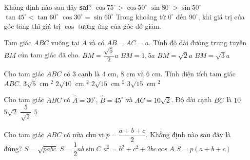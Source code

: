 \begin{ex}
	Khẳng định nào sau đây \textbf{sai}?
	\choice
	{\True $\cos 75^\circ >\cos 50^\circ $}
	{$\sin 80^\circ >\sin 50^\circ $}
	{$\tan 45^\circ <\tan 60^\circ $}
	{$\cos 30^\circ =\sin 60^\circ $}
	\loigiai
	{Trong khoảng từ $0^\circ$ đến $90^\circ$, khi giá trị của góc tăng thì giá trị $\cos$ tương ứng của góc đó giảm.}
\end{ex}

\begin{ex}
	Tam giác $ABC$ vuông tại $A$ và có $AB=AC=a$. Tính độ dài đường trung tuyến $BM$ của tam giác đã cho.
	\choice
	{\True $BM=\dfrac{\sqrt{5}}{2}a$}
	{$BM=1{,}5a$}
	{$BM=\sqrt{2}a$}
	{$BM=\sqrt{3}a$}
\end{ex}
\begin{ex}
	Cho tam giác $ABC$ có $3$ cạnh là $4$ cm, $8$ cm và $6$ cm. Tính diện tích tam giác $ABC$.
	\choice
	{$3\sqrt{5}$ cm $^2$}
	{$2\sqrt{10}$ cm $^2$}
	{$2\sqrt{15}$ cm $^2$}
	{\True $3\sqrt{15}$ cm $^2$}
\end{ex}
\begin{ex}
	Cho tam giác $ABC$ có $\widehat{A}=30^\circ$, $\widehat{B}=45^\circ$ và $AC=10\sqrt{2}$. Độ dài cạnh $BC$ là
	\choice
	{\True $10$}
	{$5\sqrt{2}$}
	{$\dfrac{5}{\sqrt{2}}$}
	{$5$}
\end{ex}
\begin{ex}
	Cho tam giác $ABC$ có nửa chu vi $p=\dfrac{a+b+c}{2}$. Khẳng định nào sau đây là đúng?
	\choice
	{$S=\sqrt{pabc}$}
	{\True $S=\dfrac12 ab \sin C$}
	{$a^2=b^2+c^2+2bc\cos A$}
	{$S=p(a+b+c)$}
\end{ex}

